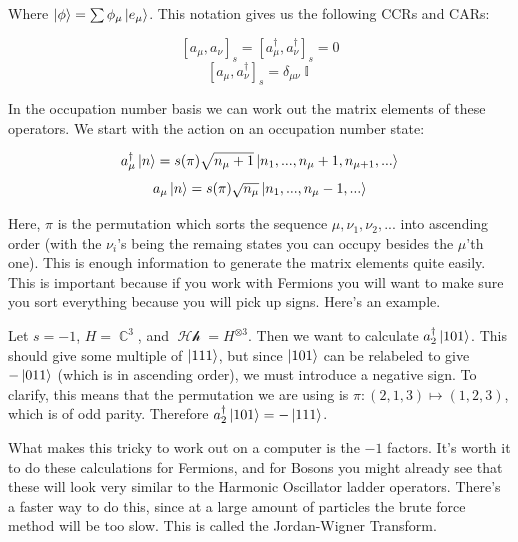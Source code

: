 \documentclass{article}
\DeclareMathOperator{\Hh}{\mathcal{Hh}}
\DeclareMathOperator{\II}{\mathbb{I}}
\DeclareMathOperator{\CC}{\mathbb{C}}
\begin{document}
Where $\ket{\phi} = \sum \phi_\mu \ket{e_\mu}$. This notation gives us the following CCRs and CARs:

\[ [a_\mu,a_\nu]_s=[a_\mu^\dagger,a_\nu^\dagger]_s=0 \]
\[ [a_\mu,a_\nu^\dagger]_s=\delta_{\mu\nu}\II \]

In the occupation number basis we can work out the matrix elements of these operators. We start with the action on an occupation number state:

\[a_\mu^\dagger \ket{n} = s(\pi) \sqrt{n_\mu+1}\ket{n_1,...,n_\mu+1,n_{\mu+1},...}\]
\[a_\mu \ket{n} = s(\pi)\sqrt{n_\mu}\ket{n_1,...,n_\mu-1,...}\]

Here, $\pi$ is the permutation which sorts the sequence $\mu,\nu_1,\nu_2,...$ into ascending order (with the $\nu_i$'s being the remaing states you can occupy besides the $\mu$'th one). This is enough information to generate the matrix elements quite easily. This is important because if you work with Fermions you will want to make sure you sort everything because you will pick up signs. Here's an example.

Let $s = -1$, $H=\CC^3$, and $\Hh = H^{\otimes 3}$. Then we want to calculate $a_2^\dagger \ket{101}$. This should give some multiple of $\ket{111}$, but since $\ket{101}$ can be relabeled to give $-\ket{011}$  (which is in ascending order), we must introduce a negative sign. To clarify, this means that the permutation we are using is $\pi : (2,1,3)\mapsto (1,2,3)$, which is of odd parity. Therefore $a_2^\dagger \ket{101}=-\ket{111}$.

What makes this tricky to work out on a computer is the $-1$ factors. It's worth it to do these calculations for Fermions, and for Bosons you might already see that these will look very similar to the Harmonic Oscillator ladder operators. There's a faster way to do this, since at a large amount of particles the brute force method will be too slow. This is called the Jordan-Wigner Transform.
\end{document}
